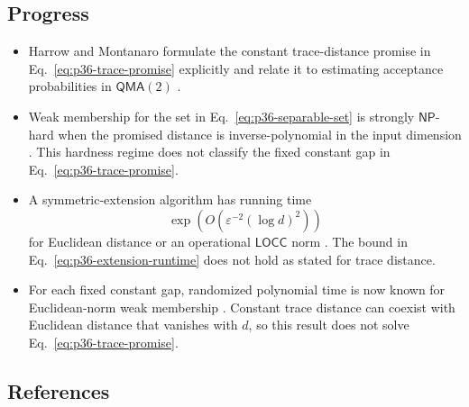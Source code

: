 \subsection*{Progress}

\begin{itemize}
  \item Harrow and Montanaro formulate the constant trace-distance promise in
  Eq.~\eqref{eq:p36-trace-promise} explicitly and relate it to estimating
  acceptance probabilities in $\mathsf{QMA}(2)$
  .

  \item Weak membership for the set in
  Eq.~\eqref{eq:p36-separable-set} is strongly $\mathsf{NP}$-hard when the
  promised distance is inverse-polynomial in the input dimension
  .  This hardness regime does not
  classify the fixed constant gap in Eq.~\eqref{eq:p36-trace-promise}.

  \item A symmetric-extension algorithm has running time
  \begin{equation}
    \exp\!\left(
      O\!\left(\varepsilon^{-2}(\log d)^2\right)
    \right)
    \label{eq:p36-extension-runtime}
  \end{equation}
  for Euclidean distance or an operational $\mathsf{LOCC}$ norm
  .  The bound in
  Eq.~\eqref{eq:p36-extension-runtime} does not hold as stated for trace
  distance.

  \item For each fixed constant gap, randomized polynomial time is now known
  for Euclidean-norm weak membership
  .  Constant trace distance can coexist
  with Euclidean distance that vanishes with $d$, so this result does not
  solve Eq.~\eqref{eq:p36-trace-promise}.
\end{itemize}

\subsection*{References}

